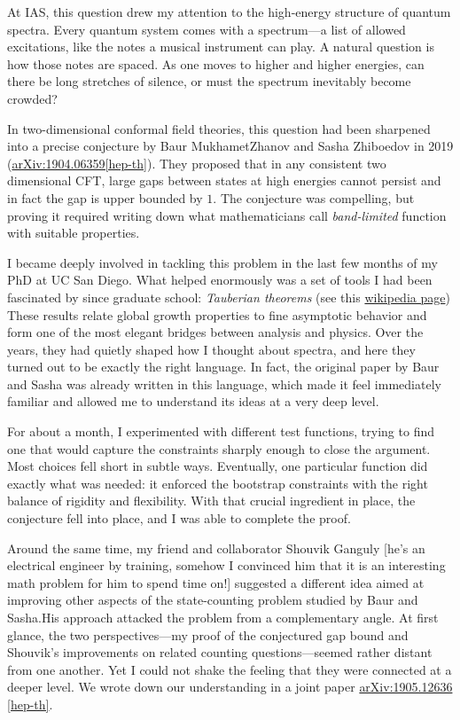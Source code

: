 \documentclass[11pt, oneside]{article}
\begin{document}
At IAS, this question drew my attention to the high-energy structure of quantum spectra. Every quantum
system comes with a spectrum—a list of allowed excitations, like the notes a musical instrument can
play. A natural question is how those notes are spaced. As one moves to higher and higher energies, can
there be long stretches of silence, or must the spectrum inevitably become crowded?



In two-dimensional conformal field theories, this question had been sharpened into a precise conjecture
by Baur MukhametZhanov and Sasha Zhiboedov in 2019
(\href{https://arxiv.org/abs/1904.06359}{arXiv:1904.06359[hep-th]}). They proposed that in any consistent two dimensional CFT,
large gaps between states at high energies cannot persist and in fact the gap is upper bounded by $1$.  The conjecture was compelling,
but proving it required writing down what mathematicians call \emph{band-limited} function with suitable properties.



I became deeply involved in tackling this problem in the last few months of my PhD at UC San Diego. What helped enormously was a set of tools I had been
fascinated by since graduate school: \emph{Tauberian theorems} (see this \href{https://en.wikipedia.org/wiki/Abelian_and_Tauberian_theorems}{wikipedia page}) These results relate global growth
properties to fine asymptotic behavior and form one of the most elegant bridges between analysis and
physics. Over the years, they had quietly shaped how I thought about spectra, and here they turned out
to be exactly the right language. In fact, the original paper by Baur and Sasha was already
written in this language, which made it feel immediately familiar and allowed me to understand its ideas at a very deep level.



For about a month, I experimented with different test functions, trying to find one that would
capture the constraints sharply enough to close the argument. Most choices fell short in subtle
ways. Eventually, one particular function did exactly what was needed: it enforced the bootstrap
constraints with the right balance of rigidity and flexibility. With that crucial ingredient in place,
the conjecture fell into place, and I was able to complete the proof.



Around the same time, my friend and collaborator Shouvik Ganguly [he's an electrical engineer by training,  somehow I convinced him that it is an interesting math problem for him to spend time on!] suggested a different idea aimed at improving
other aspects of the state-counting problem studied by Baur and Sasha.His approach attacked the
problem from a complementary angle. At first glance, the two perspectives—my proof of the conjectured
gap bound and Shouvik’s improvements on related counting questions—seemed rather distant from one
another. Yet I could not shake the feeling that they were connected at a deeper level.  We wrote down our understanding in a joint paper \href{https://arxiv.org/abs/1905.12636}{arXiv:1905.12636 [hep-th]}.
\end{document}
